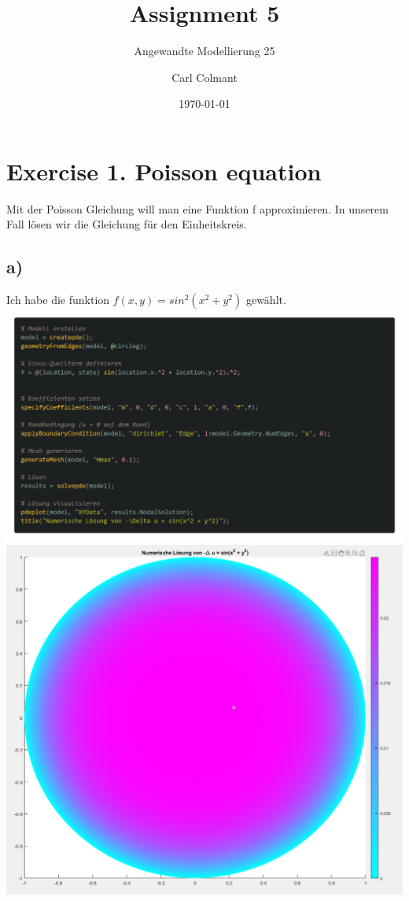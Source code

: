 \documentclass{scrartcl}
\title{Assignment 5}
\subtitle{Angewandte Modellierung 25}
\author{Carl Colmant}
\date{\today}
\begin{document}
\maketitle
\newpage
\section*{Exercise 1. Poisson equation}
Mit der Poisson Gleichung will man eine Funktion f approximieren. In unserem Fall lösen wir die Gleichung für den Einheitskreis.\\
\subsection*{a)}
Ich habe die funktion $f(x,y) = sin^2(x^2+y^2)$ gewählt.\\
\includegraphics[scale=0.2]{Poisson1a.png}\\
\includegraphics[scale=0.4]{Poisson1aplot.png}\\
\end{document}
